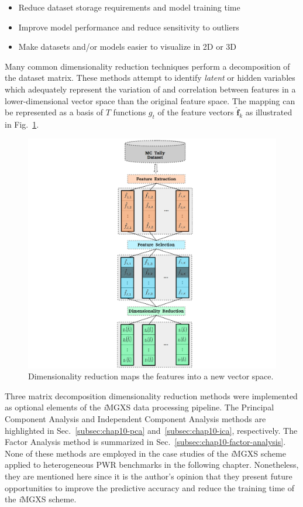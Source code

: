 \begin{itemize}[noitemsep]
\item Reduce dataset storage requirements and model training time
\item Improve model performance and reduce sensitivity to outliers
\item Make datasets and/or models easier to visualize in 2D or 3D
\end{itemize}

\noindent Many common dimensionality reduction techniques perform a decomposition of the dataset matrix. These methods attempt to identify \textit{latent} or hidden variables which adequately represent the variation of and correlation between features in a lower-dimensional vector space than the original feature space. The mapping can be represented as a basis of $T$ functions $g_{t}$ of the feature vectors $\boldsymbol{\hat{f}}_{k}$ as illustrated in Fig.~\ref{fig:chap10-agglomerate}.

\begin{figure}[h!]
\centering
\includegraphics[width=0.95\linewidth]{figures/unsupervised/features/engineering/reduce}
\vspace{2mm}
\caption[\textit{i}MGXS dimensionality reduction]{Dimensionality reduction maps the features into a new vector space.}
\label{fig:chap10-agglomerate}
\end{figure}

Three matrix decomposition dimensionality reduction methods were implemented as optional elements of the \textit{i}\ac{MGXS} data processing pipeline. The Principal Component Analysis and Independent Component Analysis methods are highlighted in Sec.~\ref{subsec:chap10-pca} and~\ref{subsec:chap10-ica}, respectively. The Factor Analysis method is summarized in Sec.~\ref{subsec:chap10-factor-analysis}. None of these methods are employed in the case studies of the \textit{i}\ac{MGXS} scheme applied to heterogeneous \ac{PWR} benchmarks in the following chapter. Nonetheless, they are mentioned here since it is the author's opinion that they present future opportunities to improve the predictive accuracy and reduce the training time of the \textit{i}\ac{MGXS} scheme.

